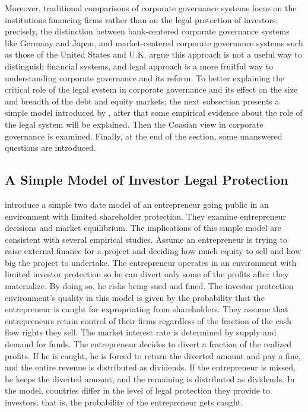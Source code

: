 \documentclass[final,1p,authoryear]{elsarticle}
\begin{document}
Moreover, traditional comparisons of corporate governance systems focus on the institutions financing firms rather than on the legal protection of investors: precisely, the distinction between bank-centered corporate governance systems like Germany and Japan, and market-centered corporate governance systems such as those of the United States and U.K. \cite{19455} argue this approach is not a useful way to distinguish financial systems, and legal approach is a more fruitful way to understanding corporate governance and its reform. To better explaining the critical role of the legal system in corporate governance and its effect on the size and breadth of the debt and equity markets; the next subsection presents a simple model introduced by \cite{19465}, after that some empirical evidence about the role of the legal system will be explained. Then the Coasian view in corporate governance is examined. Finally, at the end of the section, some unanswered questions are introduced.

\subsection{A Simple Model of Investor Legal Protection}

\cite{19465} introduce a simple two date model of an entrepreneur going public in an environment with limited shareholder protection. They examine entrepreneur decisions and market equilibrium. The implications of this simple model are consistent with several empirical studies. Assume an entrepreneur is trying to raise external finance for a project and deciding how much equity to sell and how big the project to undertake. The entrepreneur operates in an environment with limited investor protection so he can divert only some of the profits after they materialize. By doing so, he risks being sued and fined. The investor protection environment's quality in this model is given by the probability that the entrepreneur is caught for expropriating from shareholders. They assume that entrepreneurs retain control of their ﬁrms regardless of the fraction of the cash ﬂow rights they sell. The market interest rate is determined by supply and demand for funds. The entrepreneur decides to divert a fraction of the realized profits. If he is caught, he is forced to return the diverted amount and pay a fine, and the entire revenue is distributed as dividends. If the entrepreneur is missed, he keeps the diverted amount, and the remaining is distributed as dividends. In the model, countries differ in the level of legal protection they provide to investors. that is, the probability of the entrepreneur gets caught.
\end{document}
